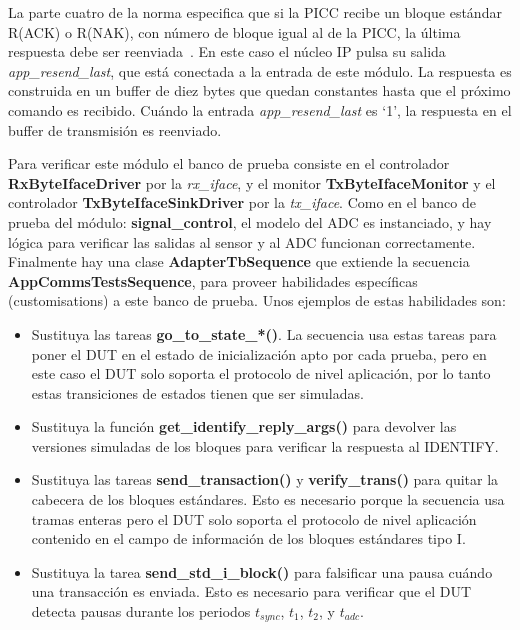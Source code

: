 \documentclass[a4paper, twoside, 11pt]{report}
\begin{document}
\FloatBarrier

La parte cuatro de la norma especifica que si la PICC recibe un bloque estándar R(ACK) o R(NAK), con número de bloque igual al de la PICC, la última respuesta debe ser reenviada~\cite{iso14443-4}. En este caso el núcleo IP pulsa su salida \textit{app\_resend\_last}, que está conectada a la entrada de este módulo. La respuesta es construida en un buffer de diez bytes que quedan constantes hasta que el próximo comando es recibido. Cuándo la entrada \textit{app\_resend\_last} es ‘1’, la respuesta en el buffer de transmisión es reenviado.

Para verificar este módulo el banco de prueba consiste en el controlador \textbf{RxByteIfaceDriver} por la \textit{rx\_iface}, y el monitor \textbf{TxByteIfaceMonitor} y el controlador \textbf{TxByteIfaceSinkDriver} por la \textit{tx\_iface}. Como en el banco de prueba del módulo: \textbf{signal\_control}, el modelo del ADC es instanciado, y hay lógica para verificar las salidas al sensor y al ADC funcionan correctamente. Finalmente hay una clase \textbf{AdapterTbSequence} que extiende la secuencia \textbf{AppCommsTestsSequence}, para proveer habilidades específicas (customisations) a este banco de prueba. Unos ejemplos de estas habilidades son:

\begin{itemize}
  \item Sustituya las tareas \textbf{go\_to\_state\_*()}. La secuencia usa estas tareas para poner el DUT en el estado de inicialización apto por cada prueba, pero en este caso el DUT solo soporta el protocolo de nivel aplicación, por lo tanto estas transiciones de estados tienen que ser simuladas.
  \item Sustituya la función \textbf{get\_identify\_reply\_args()} para devolver las versiones simuladas de los bloques para verificar la respuesta al IDENTIFY.
  \item Sustituya las tareas \textbf{send\_transaction()} y \textbf{verify\_trans()} para quitar la cabecera de los bloques estándares. Esto es necesario porque la secuencia usa tramas enteras pero el DUT solo soporta el protocolo de nivel aplicación contenido en el campo de información de los bloques estándares tipo I.
  \item Sustituya la tarea \textbf{send\_std\_i\_block()} para falsificar una pausa cuándo una transacción es enviada. Esto es necesario para verificar que el DUT detecta pausas durante los periodos $t_{sync}$, $t_1$, $t_2$, y $t_{adc}$.
\end{itemize}
\end{document}
